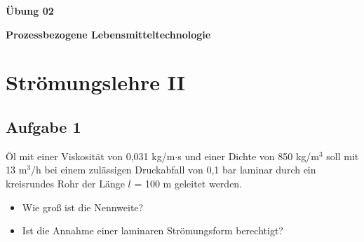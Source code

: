 \documentclass[a4paper,11pt]{article}
\begin{document}


\bckgrnd

\begin{center}
\LARGE
\color{white}
\textbf{Übung 02} \par \vspace*{2mm}
\large \color{miugray} \textbf{Prozessbezogene Lebensmitteltechnologie}
\end{center}
\par 
\vspace*{6mm}


\color{miudiutex}
\section*{Strömungslehre II}

\subsection*{Aufgabe 1}
Öl mit einer Viskosität von 0,031 kg/m$\cdot$s und einer Dichte von 850 kg/m$^3$ soll mit 13 m$^3$/h bei einem zulässigen Druckabfall von 0,1 bar laminar durch ein kreisrundes Rohr der Länge $l$ = 100 m geleitet werden. \par 
\begin{itemize}
\item Wie groß ist die Nennweite?
\item Ist die Annahme einer laminaren Strömungsform berechtigt?
\end{itemize}
 
\end{document}
